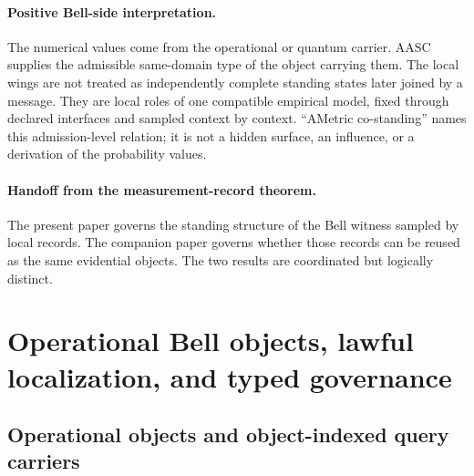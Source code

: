 \documentclass[11pt]{article}
\theoremstyle{definition}
\begin{document}
\paragraph{Positive Bell-side interpretation.}
The numerical values come from the operational or quantum carrier. AASC supplies the admissible same-domain type of the object carrying them. The local wings are not treated as independently complete standing states later joined by a message. They are local roles of one compatible empirical model, fixed through declared interfaces and sampled context by context. ``AMetric co-standing'' names this admission-level relation; it is not a hidden surface, an influence, or a derivation of the probability values.

\paragraph{Handoff from the measurement-record theorem.}
The present paper governs the standing structure of the Bell witness sampled by local records. The companion paper governs whether those records can be reused as the same evidential objects. The two results are coordinated but logically distinct.

\section{Operational Bell objects, lawful localization, and typed governance}\label{sec:scope}

\subsection{Operational objects and object-indexed query carriers}
\end{document}

